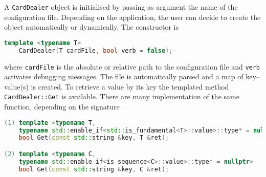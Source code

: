 \documentclass[a4paper, 11pt]{article}
\begin{document}
A \texttt{CardDealer} object is initialised by passing as argument the name of the configuration file.
Depending on the application, the user can decide to create the object automatically or dynamically.
The constructor is
\begin{lstlisting}[language=C++]
	template <typename T>
	CardDealer(T cardFile, bool verb = false);
\end{lstlisting}
where \texttt{cardFile} is the absolute or relative path to the configuration file and %
\texttt{verb} activates debugging messages.
The file is automatically parsed and a map of key--value(s) is created.
To retrieve a value by its key the templated method \texttt{CardDealer::Get} is available.
There are many implementation of the same function, depending on the signature
\begin{lstlisting}[language=C++]
(1) template <typename T,
    typename std::enable_if<std::is_fundamental<T>::value>::type* = nullptr>
    bool Get(const std::string &key, T &ret);

(2) template <typename C,
    typename std::enable_if<is_sequence<C>::value>::type* = nullptr>
    bool Get(const std::string &key, C &ret);
\end{lstlisting}
\end{document}
